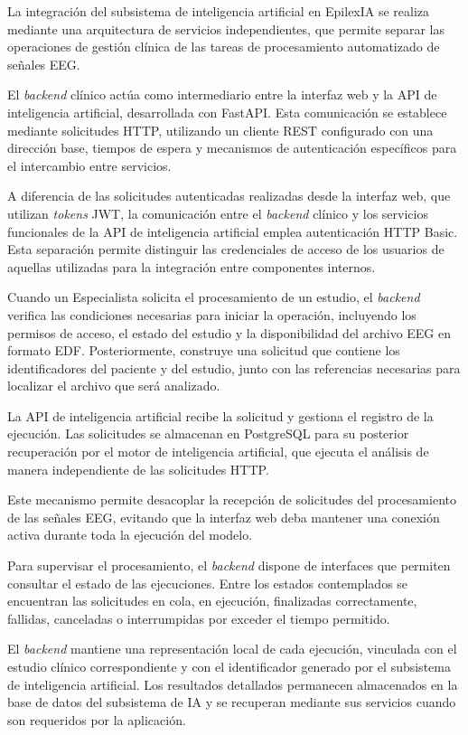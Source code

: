 La integración del subsistema de inteligencia artificial
en EpilexIA se realiza mediante una arquitectura de
servicios independientes, que permite separar las
operaciones de gestión clínica de las tareas de
procesamiento automatizado de señales EEG.

El \textit{backend} clínico actúa como intermediario entre
la interfaz web y la API de inteligencia artificial,
desarrollada con FastAPI. Esta comunicación se
establece mediante solicitudes HTTP, utilizando
un cliente REST configurado con una dirección base,
tiempos de espera y mecanismos de autenticación
específicos para el intercambio entre servicios.

A diferencia de las solicitudes autenticadas realizadas desde la interfaz web, que utilizan \textit{tokens} JWT, la comunicación entre el \textit{backend} clínico y los servicios funcionales de la API de inteligencia artificial emplea autenticación HTTP Basic. Esta separación permite distinguir las credenciales de acceso de los usuarios de aquellas utilizadas para la integración entre componentes internos.

Cuando un Especialista solicita el procesamiento
de un estudio, el \textit{backend} verifica las condiciones
necesarias para iniciar la operación, incluyendo
los permisos de acceso, el estado del estudio y
la disponibilidad del archivo EEG en formato EDF.
Posteriormente, construye una solicitud que contiene
los identificadores del paciente y del estudio,
junto con las referencias necesarias para localizar
el archivo que será analizado.

La API de inteligencia artificial recibe la solicitud
y gestiona el registro de la ejecución. Las solicitudes se almacenan en PostgreSQL para su
posterior recuperación por el motor de inteligencia
artificial, que ejecuta el análisis de manera
independiente de las solicitudes HTTP.

Este mecanismo permite desacoplar la recepción de
solicitudes del procesamiento de las señales EEG,
evitando que la interfaz web deba mantener una
conexión activa durante toda la ejecución del modelo.

Para supervisar el procesamiento, el \textit{backend} dispone
de interfaces que permiten consultar el estado de
las ejecuciones. Entre los estados contemplados se
encuentran las solicitudes en cola, en ejecución,
finalizadas correctamente, fallidas, canceladas o
interrumpidas por exceder el tiempo permitido.

El \textit{backend} mantiene una representación local de
cada ejecución, vinculada con el estudio clínico
correspondiente y con el identificador generado
por el subsistema de inteligencia artificial.
Los resultados detallados permanecen almacenados
en la base de datos del subsistema de IA y se
recuperan mediante sus servicios cuando son
requeridos por la aplicación.

